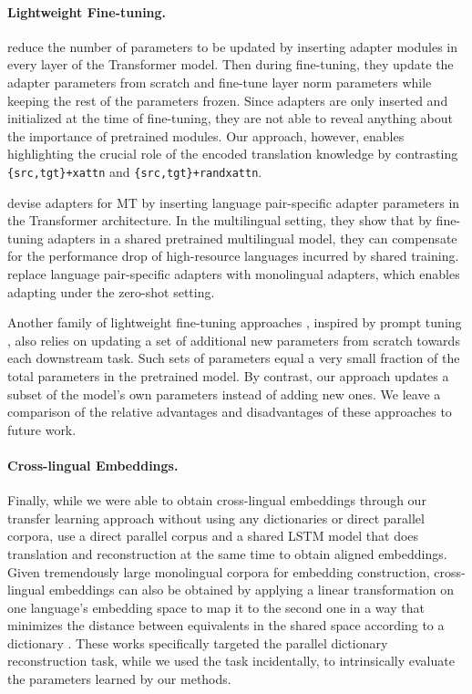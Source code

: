 \paragraph{Lightweight Fine-tuning.}  reduce the number of parameters to be updated by inserting adapter modules in every layer of the Transformer model. Then during fine-tuning, they update the adapter parameters from scratch and fine-tune layer norm parameters while keeping the rest of the parameters frozen. Since adapters are only inserted and initialized at the time of fine-tuning, they are not able to reveal anything about the importance of pretrained modules. Our approach, however, enables highlighting the crucial role of the encoded translation knowledge by contrasting \texttt{\{src,tgt\}+xattn} and \texttt{\{src,tgt\}+randxattn}.

 devise adapters for MT by inserting language pair-specific adapter parameters in the Transformer architecture. In the multilingual setting, they show that by fine-tuning adapters in a shared pretrained multilingual model, they can compensate for the performance drop of high-resource languages incurred by shared training.  replace language pair-specific adapters with monolingual adapters, which enables adapting under the zero-shot setting.

Another family of lightweight fine-tuning approaches \cite{li-liang-2021-prefix,hambardzumyan-etal-2021-warp,DBLP:journals/corr/abs-2104-08691}, inspired by prompt tuning \cite{NEURIPS2020_1457c0d6}, also relies on updating a set of additional new parameters from scratch towards each downstream task. Such sets of parameters equal a very small fraction of the total parameters in the pretrained model. By contrast, our approach updates a subset of the model's own parameters instead of adding new ones. We leave a comparison of the relative advantages and disadvantages of these approaches to future work.

\paragraph{Cross-lingual Embeddings.} Finally, while we were able to obtain cross-lingual embeddings through our transfer learning approach without using any dictionaries or direct parallel corpora,  use a direct parallel corpus and a shared LSTM model that does translation and reconstruction at the same time to obtain aligned embeddings. Given tremendously large monolingual corpora for embedding construction, cross-lingual embeddings can also be obtained by applying a linear transformation on one language's embedding space to map it to the second one in a way that minimizes the distance between equivalents in the shared space according to a dictionary \cite{DBLP:journals/corr/MikolovLS13,xing-etal-2015-normalized, artetxe-etal-2016-learning}. These works specifically targeted the parallel dictionary reconstruction task, while we used the task incidentally, to intrinsically evaluate the parameters learned by our methods.

